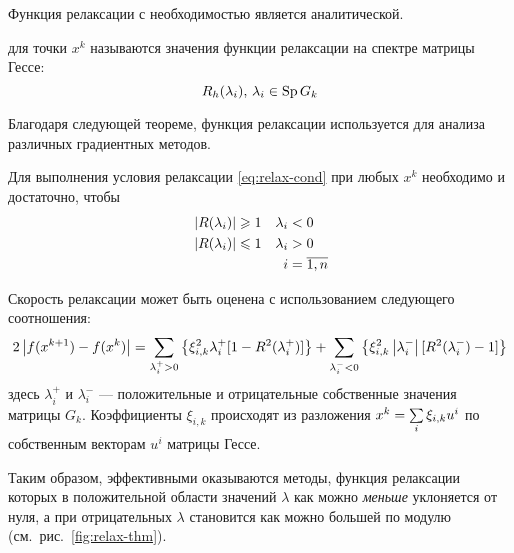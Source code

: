 \begin{rem}
  Функция релаксации с необходимостью является аналитической.
\end{rem}

\begin{dfn}
   для точки $x^k$ называются значения
  функции релаксации на спектре матрицы Гессе:
  \begin{equation}
    \label{eq:relax-fac}
    R_h(\lambda_i),\, \lambda_i \in \operatorname{Sp}{G_k}
  \end{equation}
\end{dfn}

Благодаря следующей теореме, функция релаксации используется для
анализа различных градиентных методов.

\begin{thm}
  \label{thm:relax-thm}
  Для выполнения условия релаксации \eqref{eq:relax-cond} при любых
  $x^k$ необходимо и достаточно, чтобы
  \begin{equation}
    \label{eq:relax-thm}
    \begin{aligned}
      & \left \lvert{R(\lambda_i)}\right \rvert \geqslant 1 & \lambda_i& < 0 \\
      & \left \lvert{R(\lambda_i)}\right \rvert \leqslant 1 & \lambda_i& > 0\\
      &&i& = \overline{1, n}
    \end{aligned}
  \end{equation}
\end{thm}

Скорость релаксации может быть оценена с использованием следующего
соотношения:
\begin{equation}
  \label{eq:relax-speed}
  2\left \lvert{f(x^{k+1})-f(x^k)}\right \rvert=\sum_{\lambda_i^+>0} \left\{\xi_{i,k}^2
    \lambda_i^+ [1-R^2(\lambda_i^+)]\right\} + \sum_{\lambda_i^-<0} \left\{\xi_{i,k}^2
    \left \lvert{\lambda_i^-}\right \rvert [R^2(\lambda_i^-)-1]\right\}
\end{equation}
здесь $\lambda_i^+$ и $\lambda_i^-$ — положительные и отрицательные
собственные значения матрицы $G_k$. Коэффициенты $\xi_{i,k}$
происходят из разложения $x^k=\sum\limits_i{\xi_{i,k}u^i}$ по собственным
векторам $u^i$ матрицы Гессе.

Таким образом, эффективными оказываются методы, функция релаксации
которых в положительной области значений $\lambda$ как можно
\emph{меньше} уклоняется от нуля, а при отрицательных $\lambda$
становится как можно большей по модулю
(см. рис. \ref{fig:relax-thm}).




